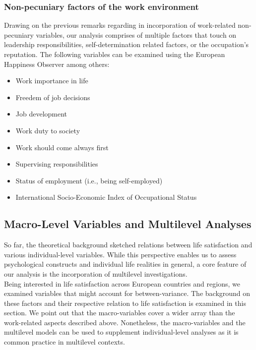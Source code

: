 \documentclass[preprint,12pt,authoryear]{elsarticle}
\begin{document}
\subsubsection{Non-pecuniary factors of the work environment}
Drawing on the previous remarks regarding in incorporation of work-related non-pecuniary variables, our analysis comprises of
multiple factors that touch on leadership responsibilities, self-determination related factors, or the occupation's reputation.
The following variables can be examined using the European Happiness Observer among others:
\begin{itemize}
   \item Work importance in life
   \item Freedem of job decisions
   \item Job development
   \item Work duty to society
   \item Work should come always first
   \item Supervising responsibilities 
   \item Status of employment (i.e., being self-employed)
   \item International Socio-Economic Index of Occupational Status   
\end{itemize}

\subsection{Macro-Level Variables and Multilevel Analyses}
So far, the theoretical background sketched relations between life satisfaction and various individual-level variables. While
this perspective enables us to assess psychological constructs and individual life realities in general, a core feature of our
analysis is the incorporation of multilevel investigations. \\
Being interested in life satisfaction across European countries and regions, we examined variables that might account for 
between-variance. The background on these factors and their respective relation to life satisfaction is examined in this 
section. We point out that the macro-variables cover a wider array than the work-related aspects described above. Nonetheless,
the macro-variables and the multilevel models can be used to supplement individual-level analyses as it is common practice
in multilevel contexts.
\end{document}
